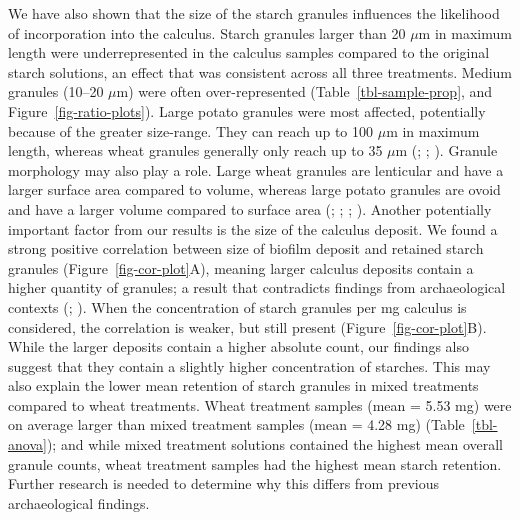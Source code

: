 \documentclass[
  b5paper,
]{book}
\begin{document}
We have also shown that the size of the starch granules influences the
likelihood of incorporation into the calculus. Starch granules larger
than 20 \(\mu\)m in maximum length were underrepresented in the calculus
samples compared to the original starch solutions, an effect that was
consistent across all three treatments. Medium granules (10--20
\(\mu\)m) were often over-represented (Table~\ref{tbl-sample-prop}, and
Figure~\ref{fig-ratio-plots}). Large potato granules were most affected,
potentially because of the greater size-range. They can reach up to 100
\(\mu\)m in maximum length, whereas wheat granules generally only reach
up to 35 \(\mu\)m (; ;
).
Granule morphology may also play a role. Large wheat granules are
lenticular and have a larger surface area compared to volume, whereas
large potato granules are ovoid and have a larger volume compared to
surface area (;
;
;
). Another potentially important factor from our results is the
size of the calculus deposit. We found a strong positive correlation
between size of biofilm deposit and retained starch granules
(Figure~\ref{fig-cor-plot}A), meaning larger calculus deposits contain a
higher quantity of granules; a result that contradicts findings from
archaeological contexts (;
). When the concentration of starch granules per mg calculus is
considered, the correlation is weaker, but still present
(Figure~\ref{fig-cor-plot}B). While the larger deposits contain a higher
absolute count, our findings also suggest that they contain a slightly
higher concentration of starches. This may also explain the lower mean
retention of starch granules in mixed treatments compared to wheat
treatments. Wheat treatment samples (mean = 5.53 mg) were on average
larger than mixed treatment samples (mean = 4.28 mg)
(Table~\ref{tbl-anova}); and while mixed treatment solutions contained
the highest mean overall granule counts, wheat treatment samples had the
highest mean starch retention. Further research is needed to determine
why this differs from previous archaeological findings.
\end{document}

